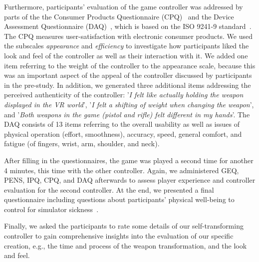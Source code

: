 \documentclass{sigchi}
\begin{document}
Furthermore, participants' evaluation of the game controller was addressed by parts of the the Consumer Products Questionnaire (CPQ)~\cite{McNamara2011375} and the Device Assessment Questionnaire (DAQ)~\cite{Douglas:1999:TPD:302979.303042}, which is based on the ISO 9241-9 standard~\cite{ISO.2000}. 
The CPQ measures user-satisfaction with electronic consumer products. We used the subscales \textit{appearance} and \textit{efficiency} to investigate how participants liked the look and feel of the controller as well as their interaction with it. We added one item referring to the weight of the controller to the appearance scale, because this was an important aspect of the appeal of the controller discussed by participants in the pre-study. 
In addition, we generated three additional items addressing the perceived authenticity of the controller: '\textit{I felt like actually holding the weapon displayed in the VR world}',
'\textit{I felt a shifting of weight when changing the weapon}', and
'\textit{Both weapons in the game (pistol and rifle) felt different in my hands}'.
The DAQ consists of 13 items referring to the overall usability as well as issues of physical operation (effort, smoothness), accuracy, speed, general comfort, and fatigue (of fingers, wrist, arm, shoulder, and neck). 

After filling in the questionnaires, the game was played a second time for another 4 minutes, this time with the other controller. Again, we administered GEQ, PENS, IPQ, CPQ, and DAQ afterwards to assess player experience and controller evaluation for the second controller.
At the end, we presented a final questionnaire including questions about participants' physical well-being to control for simulator sickness~\cite{Kennedy.1993}. 

Finally, we asked the participants to rate some details of our self-transforming controller to gain comprehensive insights into the evaluation of our specific creation, e.g., the time and process of the weapon transformation, and the look and feel.

\end{document}
